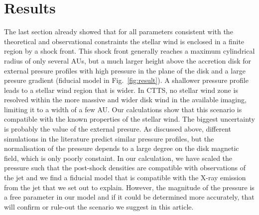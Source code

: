 \section{Results}
\label{sect:results}
The last section already showed that for all parameters consistent with the theoretical and observational constraints the stellar wind is enclosed in a finite region by a shock front. This shock front generally reaches a maximum cylindrical radius of only several AUs, but a much larger height above the accretion disk for external presure profiles with high pressure in the plane of the disk and a large presure gradient (fiducial model in Fig.~\ref{fig:result}). A shallower pressure profile leads to a stellar wind region that is wider. In CTTS, no stellar wind zone is resolved within the more massive and wider disk wind in the available imaging, limiting it to a width of a few AU. Our calculations show that this scenario is compatible with the known properties of the stellar wind. The biggest uncertainty is probably the value of the external presure. As discussed above, different simulations in the literature predict similar pressure profiles, but the normalisation of the pressure depends to a large degree on the disk magnetic field, which is only poorly constaint. In our calculation, we have scaled the pressure such that the post-shock densities are compatible with observations of the jet and we find a fiducial model that is compatible with the X-ray emission from the jet that we set out to explain. However, the magnitude of the pressure is a free parameter in our model and if it could be determined more accurately, that will confirm or rule-out the scenario we suggest in this article.

